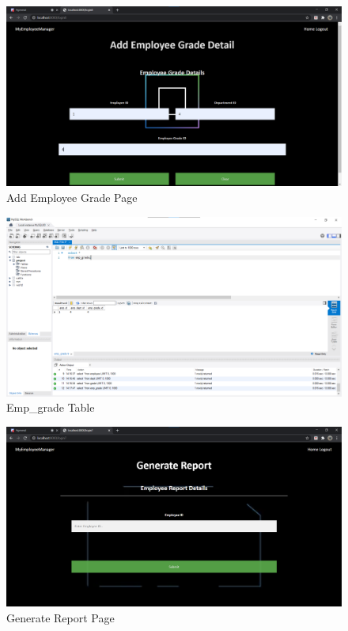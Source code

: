 \documentclass[12pt]{article}
\begin{document}
\begin{figure}
    \centering
    \includegraphics[width = \columnwidth]{screenshots/addempgradepage.png}
    \caption{Add Employee Grade Page}
    \label{fig:my_label}
\end{figure}

\begin{figure}
    \centering
    \includegraphics[width = \columnwidth]{screenshots/addempgradesql.png}
    \caption{Emp\_grade Table}
    \label{fig:my_label}
\end{figure}

\begin{figure}
    \centering
    \includegraphics[width = \columnwidth]{screenshots/generatereportpage.png}
    \caption{Generate Report Page}
    \label{fig:my_label}
\end{figure}
\end{document}
